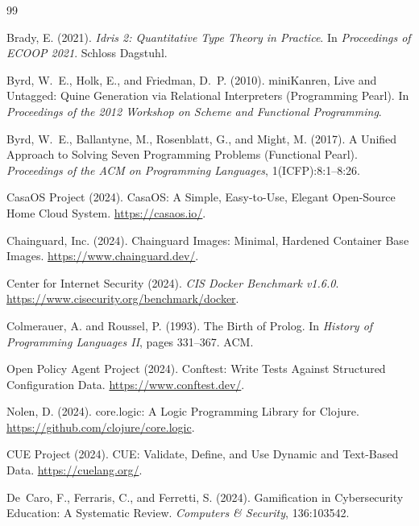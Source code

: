 \documentclass[11pt,twocolumn]{article}
\begin{document}
\begin{thebibliography}{99}

Brady, E. (2021).
\newblock \emph{Idris 2: Quantitative Type Theory in Practice}.
\newblock In \emph{Proceedings of ECOOP 2021}.
\newblock Schloss Dagstuhl.

Byrd, W.~E., Holk, E., and Friedman, D.~P. (2010).
\newblock miniKanren, Live and Untagged: Quine Generation via
Relational Interpreters (Programming Pearl).
\newblock In \emph{Proceedings of the 2012 Workshop on Scheme and
Functional Programming}.

Byrd, W.~E., Ballantyne, M., Rosenblatt, G., and Might, M. (2017).
\newblock A Unified Approach to Solving Seven Programming Problems
(Functional Pearl).
\newblock \emph{Proceedings of the ACM on Programming Languages},
1(ICFP):8:1--8:26.

CasaOS Project (2024).
\newblock CasaOS: A Simple, Easy-to-Use, Elegant Open-Source Home
Cloud System.
\newblock \url{https://casaos.io/}.

Chainguard, Inc. (2024).
\newblock Chainguard Images: Minimal, Hardened Container Base Images.
\newblock \url{https://www.chainguard.dev/}.

Center for Internet Security (2024).
\newblock \emph{CIS Docker Benchmark v1.6.0}.
\newblock \url{https://www.cisecurity.org/benchmark/docker}.

Colmerauer, A. and Roussel, P. (1993).
\newblock The Birth of Prolog.
\newblock In \emph{History of Programming Languages II},
pages 331--367. ACM.

Open Policy Agent Project (2024).
\newblock Conftest: Write Tests Against Structured Configuration Data.
\newblock \url{https://www.conftest.dev/}.

Nolen, D. (2024).
\newblock core.logic: A Logic Programming Library for Clojure.
\newblock \url{https://github.com/clojure/core.logic}.

CUE Project (2024).
\newblock CUE: Validate, Define, and Use Dynamic and Text-Based
Data.
\newblock \url{https://cuelang.org/}.

De~Caro, F., Ferraris, C., and Ferretti, S. (2024).
\newblock Gamification in Cybersecurity Education: A Systematic Review.
\newblock \emph{Computers \& Security}, 136:103542.


\end{thebibliography}
\end{document}
